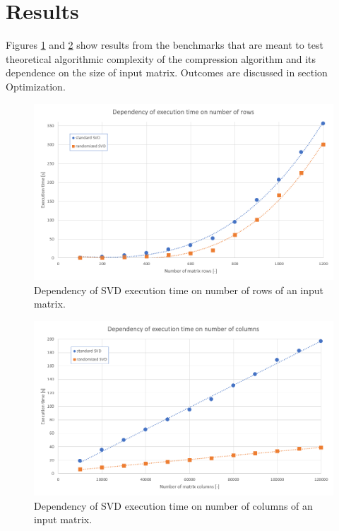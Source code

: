 \section{Results}
\label{sec:results}

Figures \ref{fig:ExeTime_rows} and \ref{fig:ExeTime_columns} show results from the benchmarks that are meant to test theoretical algorithmic complexity of the compression algorithm and its dependence on the size of input matrix. Outcomes are discussed in section Optimization.

\begin{figure}[H]
\centering\includegraphics[width=\textwidth]{figures/executionTime_varyingRows}
\caption{Dependency of SVD execution time on number of rows of an input matrix.}
\label{fig:ExeTime_rows}
\end{figure}

\begin{figure}[H]
\centering\includegraphics[width=\textwidth]{figures/executionTime_varyingColumns}
\caption{Dependency of SVD execution time on number of columns of an input matrix.}
\label{fig:ExeTime_columns}
\end{figure}


